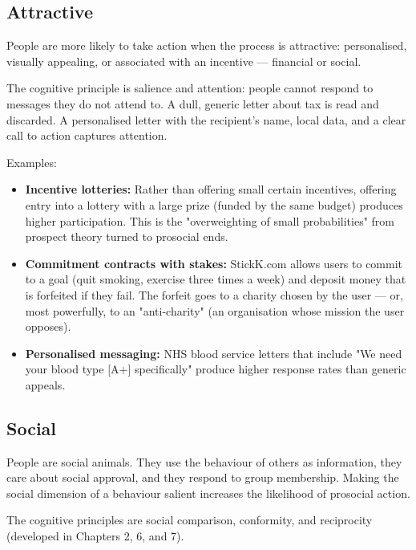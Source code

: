 \documentclass[12pt, letterpaper]{article}
\begin{document}
\subsection{Attractive}


People are more likely to take action when the process is attractive: personalised, visually appealing, or associated with an incentive --- financial or social.

The cognitive principle is salience and attention: people cannot respond to messages they do not attend to. A dull, generic letter about tax is read and discarded. A personalised letter with the recipient's name, local data, and a clear call to action captures attention.

Examples:
\begin{itemize}
\item \textbf{Incentive lotteries:} Rather than offering small certain incentives, offering entry into a lottery with a large prize (funded by the same budget) produces higher participation. This is the "overweighting of small probabilities" from prospect theory turned to prosocial ends.
\item \textbf{Commitment contracts with stakes:} StickK.com allows users to commit to a goal (quit smoking, exercise three times a week) and deposit money that is forfeited if they fail. The forfeit goes to a charity chosen by the user --- or, most powerfully, to an "anti-charity" (an organisation whose mission the user opposes).
\item \textbf{Personalised messaging:} NHS blood service letters that include "We need your blood type [A+] specifically" produce higher response rates than generic appeals.
\end{itemize}


\subsection{Social}


People are social animals. They use the behaviour of others as information, they care about social approval, and they respond to group membership. Making the social dimension of a behaviour salient increases the likelihood of prosocial action.

The cognitive principles are social comparison, conformity, and reciprocity (developed in Chapters 2, 6, and 7).
\end{document}

